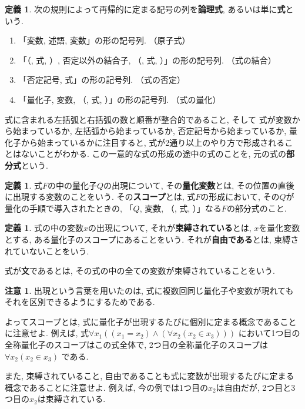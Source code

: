 \documentclass[a4paper, twoside]{bxjsarticle}
\theoremstyle{definition}
\newtheorem{defn}[thm]{定義}
\newtheorem{rem}[thm]{注意}
\begin{document}
    \begin{defn}    
        次の規則によって再帰的に定まる記号の列を\textbf{論理式}, あるいは単に\textbf{式}という.
        \begin{enumerate}
            \item 「変数, 述語, 変数」の形の記号列. （原子式）
            \item 「（, 式, ）, 否定以外の結合子, （, 式, ）」の形の記号列. （式の結合）
            \item 「否定記号, 式」の形の記号列. （式の否定）
            \item 「量化子, 変数, （, 式, ）」の形の記号列. （式の量化）
        \end{enumerate}
        式に含まれる左括弧と右括弧の数と順番が整合的であること, そして        式が変数から始まっているか, 左括弧から始まっているか, 否定記号から始まっているか, 量化子から始まっているかに注目すると, 式が2通り以上のやり方で形成されることはないことがわかる. この一意的な式の形成の途中の式のことを, 元の式の\textbf{部分式}という.
    \end{defn}
    \begin{defn}
        式$F$の中の量化子$Q$の出現について, その\textbf{量化変数}とは, その位置の直後に出現する変数のことをいう.  その\textbf{スコープ}とは, 式$F$の形成において, その$Q$が量化の手順で導入されたときの, 「$Q$, 変数, （, 式, ）」なる$F$の部分式のこと.
    \end{defn}
    \begin{defn}
        式の中の変数$x$の出現について,  それが\textbf{束縛されている}とは, $x$を量化変数とする, ある量化子のスコープにあることをいう. それが\textbf{自由である}とは, 束縛されていないことをいう.
        
        式が\textbf{文}であるとは, その式の中の全ての変数が束縛されていることをいう.
    \end{defn}
    \begin{rem}
        出現という言葉を用いたのは, 式に複数回同じ量化子や変数が現れてもそれを区別できるようにするためである.
        
        よってスコープとは, 式に量化子が出現するたびに個別に定まる概念であることに注意せよ. 例えば, 式$\forall x_1 ((x_1=x_2) \land (\forall x_2 (x_2 \in x_3)))$ において1つ目の全称量化子のスコープはこの式全体で, 2つ目の全称量化子のスコープは$\forall x_2 (x_2 \in x_3)$ である.
        
        また, 束縛されていること, 自由であることも式に変数が出現するたびに定まる概念であることに注意せよ. 例えば, 今の例では1つ目の$x_2$は自由だが, 2つ目と3つ目の$x_2$は束縛されている.
    \end{rem}
\end{document}
